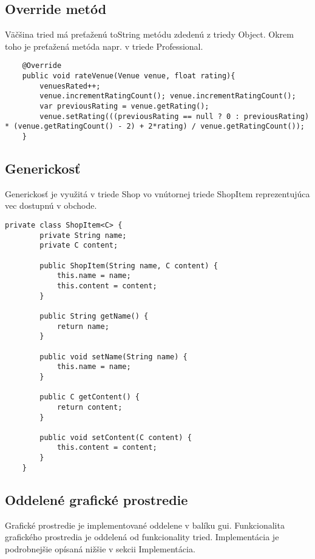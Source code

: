 \documentclass{article}
\begin{document}
\subsection{Override metód}
Väčšina tried má preťaženú toString metódu zdedenú z triedy Object. Okrem toho je preťažená metóda napr. v triede Professional.
\begin{verbatim}
    @Override
    public void rateVenue(Venue venue, float rating){
        venuesRated++;
        venue.incrementRatingCount(); venue.incrementRatingCount();
        var previousRating = venue.getRating();
        venue.setRating(((previousRating == null ? 0 : previousRating) * (venue.getRatingCount() - 2) + 2*rating) / venue.getRatingCount());
    }
\end{verbatim}
\subsection{Generickosť}
Generickosť je využitá v triede Shop vo vnútornej triede ShopItem reprezentujúca vec dostupnú v obchode.
\begin{verbatim}
private class ShopItem<C> {
        private String name;
        private C content;

        public ShopItem(String name, C content) {
            this.name = name;
            this.content = content;
        }

        public String getName() {
            return name;
        }

        public void setName(String name) {
            this.name = name;
        }

        public C getContent() {
            return content;
        }

        public void setContent(C content) {
            this.content = content;
        }
    }
\end{verbatim}

\subsection{Oddelené grafické prostredie}
Grafické prostredie je implementované oddelene v balíku gui. Funkcionalita grafického prostredia je oddelená od funkcionality tried. Implementácia je podrobnejšie opísaná nižšie v sekcii Implementácia.
\end{document}
